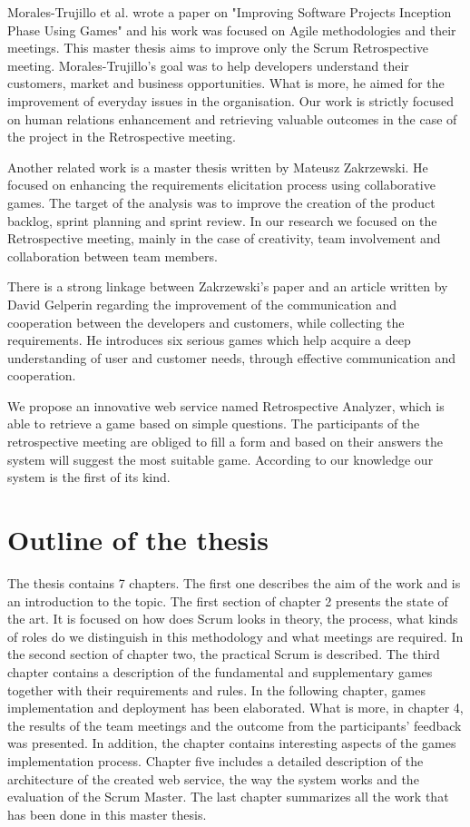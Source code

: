 Morales-Trujillo et al. \cite{MiguelGames} wrote a paper on "Improving Software Projects Inception Phase Using Games" and his work was focused on Agile methodologies and their meetings. This master thesis aims to improve only the Scrum Retrospective meeting. Morales-Trujillo's goal was to help developers understand their customers, market and business opportunities. What is more, he aimed for the improvement of everyday issues in the organisation. Our work is strictly focused on human relations enhancement and retrieving valuable outcomes in the case of the project in the Retrospective meeting. 

Another related work is a master thesis written by Mateusz Zakrzewski\cite{Zakrzewski}. He focused on enhancing the requirements elicitation process using collaborative games. The target of the analysis was to improve the creation of the product backlog, sprint planning and sprint review. In our research we focused on the Retrospective meeting, mainly in the case of creativity, team involvement and collaboration between team members. 

There is a strong linkage between Zakrzewski's paper and an article written by David Gelperin \cite{related2} regarding the improvement of the communication and cooperation between the developers and customers, while collecting the requirements. He introduces six serious games which help acquire a deep understanding of user and customer needs, through effective communication and cooperation.

We propose an innovative web service named Retrospective Analyzer, which is able to retrieve a game based on simple questions. The participants of the retrospective meeting are obliged to fill a form and based on their answers the system will suggest the most suitable game. According to our knowledge our system is the first of its kind.

\section{Outline of the thesis}

The thesis contains 7 chapters. The first one describes the aim of the work and is an introduction to the topic. The first section of chapter 2 presents the state of the art. It is focused on how does Scrum looks in theory, the process, what kinds of roles do we distinguish in this methodology and what meetings are required. In the second section of chapter two, the practical Scrum is described. The third chapter contains a description of the fundamental and supplementary games together with their requirements and rules. In the following chapter, games implementation and deployment has been elaborated. What is more, in chapter 4, the results of the team meetings and the outcome from the participants' feedback was presented. In addition, the chapter contains interesting aspects of the games implementation process. Chapter five includes a detailed description of the architecture of the created web service, the way the system works and the evaluation of the Scrum Master. The last chapter summarizes all the work that has been done in this master thesis.
